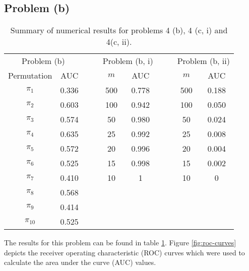 \subsection*{Problem (b)}

\begin{table}
\centering{}\caption{Summary of numerical results for problems 4 (b), 4 (c, i) and 4(c,
ii).\label{tab:result-table}}
\begin{tabular}{cccccccc}
\toprule 
\multicolumn{2}{c}{Problem (b)} & $\quad$ & \multicolumn{2}{c}{Problem (b, i)} & $\quad$ & \multicolumn{2}{c}{Problem (b, ii)}\tabularnewline
\cmidrule{1-2} \cmidrule{4-5} \cmidrule{7-8} 
Permutation & AUC &  & $m$ & AUC &  & $m$ & AUC\tabularnewline
\cmidrule{1-2} \cmidrule{4-5} \cmidrule{7-8} 
$\pi_{1}$ & 0.336 &  & 500 & 0.778 &  & 500 & 0.188\tabularnewline
$\pi_{2}$ & 0.603 &  & 100 & 0.942 &  & 100 & 0.050\tabularnewline
$\pi_{3}$ & 0.574 &  & 50 & 0.980 &  & 50 & 0.024\tabularnewline
$\pi_{4}$ & 0.635 &  & 25 & 0.992 &  & 25 & 0.008\tabularnewline
$\pi_{5}$ & 0.572 &  & 20 & 0.996 &  & 20 & 0.004\tabularnewline
$\pi_{6}$ & 0.525 &  & 15 & 0.998 &  & 15 & 0.002\tabularnewline
$\pi_{7}$ & 0.410 &  & 10 & 1 &  & 10 & 0\tabularnewline
$\pi_{8}$ & 0.568 &  &  &  &  &  & \tabularnewline
$\pi_{9}$ & 0.414 &  &  &  &  &  & \tabularnewline
$\pi_{10}$ & 0.525 &  &  &  &  &  & \tabularnewline
\bottomrule
\end{tabular}
\end{table}


The results for this problem can be found in table \ref{tab:result-table}.
Figure \ref{fig:roc-curves} depicts the receiver operating characteristic
(ROC) curves which were used to calculate the area under the curve
(AUC) values.
